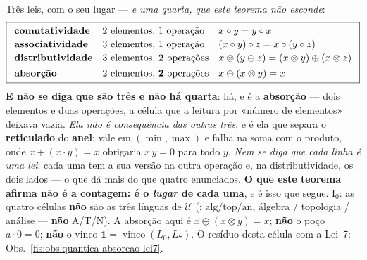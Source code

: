 \documentclass[livro.tex]{subfiles}
\begin{document}
\begin{teorema}\label{fis:thm:trial}
Três leis, com o seu lugar --- \emph{e uma quarta, que este teorema não esconde}:
\[
\boxed{
\begin{array}{lll}
\textbf{comutatividade} & \text{2 elementos, 1 operação} & x\circ y=y\circ x\\[2pt]
\textbf{associatividade} & \text{3 elementos, 1 operação} & (x\circ y)\circ z=x\circ(y\circ z)\\[2pt]
\textbf{distributividade} & \text{3 elementos, \textbf{2} operações} & x\otimes(y\oplus z)=(x\otimes y)\oplus(x\otimes z)\\[4pt]
\textbf{absorção} & \text{2 elementos, \textbf{2} operações} & x\oplus(x\otimes y)=x
\end{array}}
\]
\textbf{E não se diga que são três e não há quarta}: há, e é a
\textbf{absorção} --- dois elementos e duas operações, a célula que a leitura
por «número de elementos» deixava vazia. \emph{Ela não é consequência das outras
três}, e é ela que separa o \textbf{reticulado} do \textbf{anel}: vale em
$(\min,\max)$ e falha na soma com o produto, onde $x+(x\cdot y)=x$ obrigaria
$x\,y=0$ para todo $y$. \emph{Nem se diga que cada linha é uma lei}: cada uma tem
a sua versão na outra operação e, na distributividade, os dois lados --- o que dá
mais do que quatro enunciados. \textbf{O que este teorema afirma não é a
contagem: é o \emph{lugar} de cada uma}, e é isso que segue.
\(\mathrm{I}_{0}\): as quatro células \textbf{não} são as três
línguas de \(\mathcal{U}\)
(: \(\mathrm{alg}/\mathrm{top}/\mathrm{an}\),
álgebra / topologia / análise --- \textbf{não} A/T/N).
A absorção aqui é
\(x\oplus(x\otimes y)=x\);
\textbf{não} o poço \(a\cdot 0=0\);
\textbf{não} o vinco
\(\mathbf{1}=\operatorname{vinco}(L_0,L_7)\).
O resíduo desta célula com a Lei~7:
Obs.~\ref{fis:obs:quantica-absorcao-lei7}.


\end{teorema}
\end{document}
